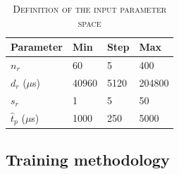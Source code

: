 \begin{table}[t]
\centering
\renewcommand{\arraystretch}{1.2}
\caption{\textsc{Definition of the input parameter space}\label{tab:sumo parameters}}
\begin{tabular}{llll}
\hline
\textbf{Parameter}       & \textbf{Min}  & \textbf{Step}   & \textbf{Max}  \\
\hline
$n_r$        & 60 & 5 & 400  \\
$d_r$ ($\mu$s)          & 40960 & 5120 & 204800    \\
$s_r$           & 1 & 5 & 50    \\
$\hat{t}_p$ ($\mu$s)           & 1000 & 250 & 5000    \\
\hline
\end{tabular}
\end{table}


 





\subsection{Training methodology \label{subs:raw_training}}


